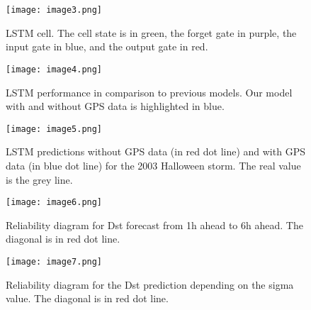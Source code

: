 
\begin{figure}
	\noindent\texttt{[image: image3.png]}
	\caption{LSTM cell. The cell state is in green, the forget gate in purple, the input gate in blue, and the output gate in red.}
	\label{fig:lstmcell}
\end{figure}






\begin{figure}
	\texttt{[image: image4.png]}
	\caption{LSTM performance in comparison to previous models. Our model with and without GPS data is highlighted in blue.}
	\label{fig:lstmperf}
\end{figure}






\begin{figure}
	\texttt{[image: image5.png]}
	\caption{LSTM predictions without GPS data (in red dot line) and with GPS data (in blue dot line) for the 2003 Halloween storm. The real value is the grey line.}
	\label{fig:lstmpredswoGPS}
\end{figure}





\begin{figure}
	\texttt{[image: image6.png]}
	\caption{Reliability diagram for Dst forecast from 1h ahead to 6h ahead. The diagonal is in red dot line.}
	\label{fig:gpnnreliability}
\end{figure}






\begin{figure}
	\texttt{[image: image7.png]}
	\caption{Reliability diagram for the Dst prediction depending on the sigma value. The diagonal is in red dot line.}
	\label{fig:gpnnreliabilitysigma}	
\end{figure}


